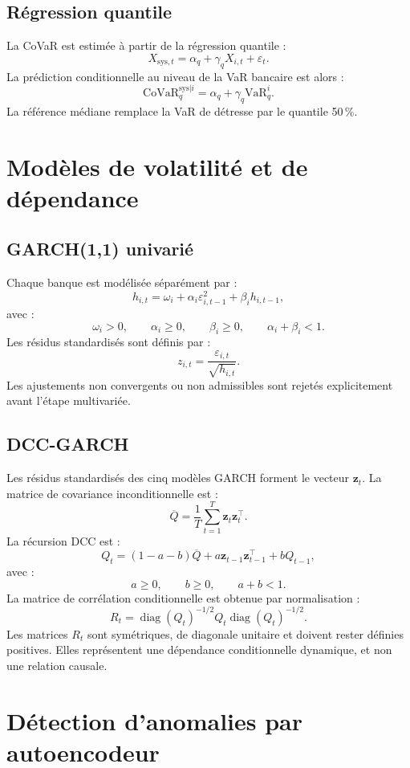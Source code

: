 \documentclass[12pt,a4paper]{article}
\begin{document}
\subsection{Régression quantile}

La CoVaR est estimée à partir de la régression quantile :
\[
  X_{\mathrm{sys},t}
  =
  \alpha_q+\gamma_qX_{i,t}+\varepsilon_t.
\]
La prédiction conditionnelle au niveau de la VaR bancaire est alors :
\[
  \mathrm{CoVaR}_{q}^{\mathrm{sys}|i}
  =
  \alpha_q+\gamma_q\mathrm{VaR}_{q}^{i}.
\]
La référence médiane remplace la VaR de détresse par le quantile 50\,\%.

\section{Modèles de volatilité et de dépendance}

\subsection{GARCH(1,1) univarié}

Chaque banque est modélisée séparément par :
\[
  h_{i,t}
  =
  \omega_i+\alpha_i\varepsilon_{i,t-1}^{2}
  +\beta_i h_{i,t-1},
\]
avec :
\[
  \omega_i>0,\qquad
  \alpha_i\geq 0,\qquad
  \beta_i\geq 0,\qquad
  \alpha_i+\beta_i<1.
\]
Les résidus standardisés sont définis par :
\[
  z_{i,t}=\frac{\varepsilon_{i,t}}{\sqrt{h_{i,t}}}.
\]
Les ajustements non convergents ou non admissibles sont rejetés explicitement avant l'étape
multivariée.

\subsection{DCC-GARCH}

Les résidus standardisés des cinq modèles GARCH forment le vecteur $\mathbf{z}_t$. La matrice
de covariance inconditionnelle est :
\[
  \overline{Q}
  =
  \frac{1}{T}\sum_{t=1}^{T}\mathbf{z}_t\mathbf{z}_t^\top.
\]
La récursion DCC est :
\[
  Q_t
  =
  (1-a-b)\overline{Q}
  +a\mathbf{z}_{t-1}\mathbf{z}_{t-1}^{\top}
  +bQ_{t-1},
\]
avec :
\[
  a\geq0,\qquad b\geq0,\qquad a+b<1.
\]
La matrice de corrélation conditionnelle est obtenue par normalisation :
\[
  R_t
  =
  \operatorname{diag}(Q_t)^{-1/2}
  Q_t
  \operatorname{diag}(Q_t)^{-1/2}.
\]
Les matrices $R_t$ sont symétriques, de diagonale unitaire et doivent rester définies positives.
Elles représentent une dépendance conditionnelle dynamique, et non une relation causale.

\section{Détection d'anomalies par autoencodeur}
\end{document}
